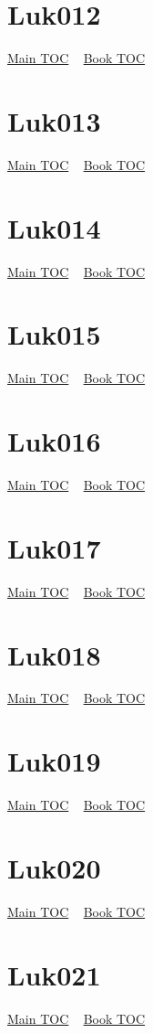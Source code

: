 \documentclass{book}
\begin{document}
  \section{Luk012}\hyperlink{toc}{Main TOC} ~ \hyperref[subsec:Luk]{Book TOC} 
  \section{Luk013}\hyperlink{toc}{Main TOC} ~ \hyperref[subsec:Luk]{Book TOC} 
  \section{Luk014}\hyperlink{toc}{Main TOC} ~ \hyperref[subsec:Luk]{Book TOC} 
  \section{Luk015}\hyperlink{toc}{Main TOC} ~ \hyperref[subsec:Luk]{Book TOC} 
  \section{Luk016}\hyperlink{toc}{Main TOC} ~ \hyperref[subsec:Luk]{Book TOC} 
  \section{Luk017}\hyperlink{toc}{Main TOC} ~ \hyperref[subsec:Luk]{Book TOC} 
  \section{Luk018}\hyperlink{toc}{Main TOC} ~ \hyperref[subsec:Luk]{Book TOC} 
  \section{Luk019}\hyperlink{toc}{Main TOC} ~ \hyperref[subsec:Luk]{Book TOC} 
  \section{Luk020}\hyperlink{toc}{Main TOC} ~ \hyperref[subsec:Luk]{Book TOC} 
  \section{Luk021}\hyperlink{toc}{Main TOC} ~ \hyperref[subsec:Luk]{Book TOC} 
\end{document}
